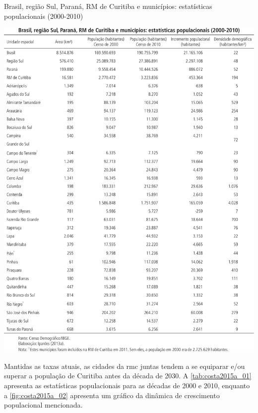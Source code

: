 	\begin{table}
		\centering
		\caption{Brasil, região Sul, Paraná, RM de Curitiba e municípios: estatísticas populacionais (2000-2010)}
		\includegraphics[width=1.0\linewidth]{img/costa2015a_01}
		\label{tab:costa2015a_01}
	\end{table}
	
	Mantidas as taxas atuais, as cidades da \gls{rmc} juntas tendem a se equiparar e/ou superar a  população de Curitiba antes da década de 2030. A \autoref{tab:costa2015a_01} apresenta as estatísticas populacionais para as décadas de 2000 e 2010, enquanto a \autoref{fig:costa2015a_02} apresenta um gráfico da dinâmica de crescimento populacional mencionada.
	
